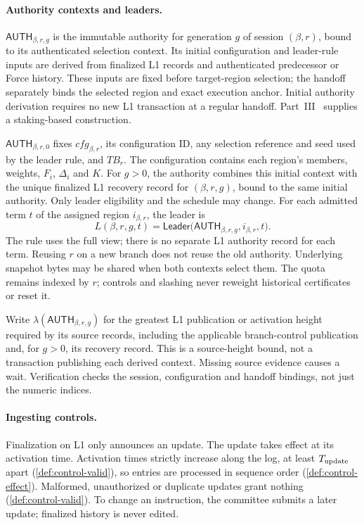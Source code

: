 \documentclass[11pt,a4paper]{article}
\newcommand{\TB}{\mathit{TB}}
\newcommand{\tagg}[1]{\ensuremath{\mathsf{#1}}}
\begin{document}
\paragraph{Authority contexts and leaders.}
\label{sec:authority-context}
$\tagg{AUTH}_{\beta,r,g}$ is the immutable authority for generation $g$
of session $(\beta,r)$, bound to its authenticated selection context.
Its initial configuration and leader-rule inputs are derived from
finalized L1 records and authenticated predecessor or Force history.
These inputs are fixed before target-region selection; the handoff
separately binds the selected region and exact execution anchor.
Initial authority derivation requires no new L1 transaction at a regular
handoff. Part~III~\cite{part3} supplies a staking-based construction.

$\tagg{AUTH}_{\beta,r,0}$ fixes $\mathit{cfg}_{\beta,r}$, its configuration
ID, any selection reference and seed used by the leader rule, and $\TB_r$.
The configuration contains each region's members, weights, $F_i$,
$\Delta_i$ and $K$. For $g>0$, the authority combines this initial
context with the unique finalized L1 recovery record for $(\beta,r,g)$,
bound to the same initial authority. Only leader eligibility and the
schedule may change. For each admitted term $t$ of the assigned region
$i_{\beta,r}$, the leader is
\[
 L(\beta,r,g,t)=\tagg{Leader}
 \bigl(\tagg{AUTH}_{\beta,r,g},i_{\beta,r},t\bigr).
\]
The rule uses the full view; there is no
separate L1 authority record for each term. Reusing $r$ on a new branch
does not reuse the old authority. Underlying snapshot bytes may be shared
when both contexts select them. The quota remains indexed by $r$;
controls and slashing never reweight historical certificates or reset it.

Write $\lambda(\tagg{AUTH}_{\beta,r,g})$ for the greatest L1 publication
or activation height required by its source records, including the
applicable branch-control publication and, for $g>0$, its recovery record.
This is a source-height bound, not a transaction publishing each derived
context. Missing source evidence causes a wait. Verification checks the
session, configuration and handoff bindings, not just the numeric indices.

\paragraph{Ingesting controls.}
Finalization on L1 only announces an update. The update takes effect at
its activation time. Activation times strictly increase along the log,
at least $T_{\rm update}$ apart (\cref{def:control-valid}), so entries
are processed in sequence order (\cref{def:control-effect}). Malformed,
unauthorized or duplicate updates grant nothing
(\cref{def:control-valid}). To change an instruction, the committee
submits a later update; finalized history is never edited.
\end{document}
